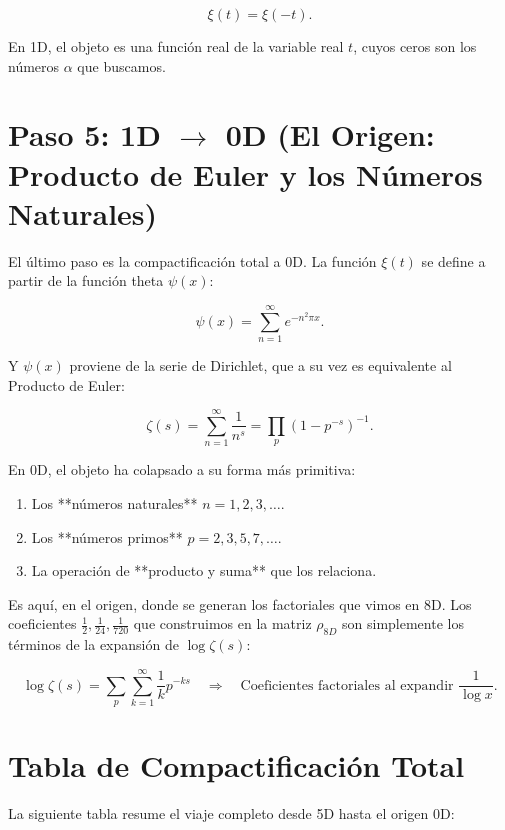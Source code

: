 \documentclass[12pt,a4paper]{article}
\begin{document}
\[
\xi(t) = \xi(-t).
\]

En 1D, el objeto es una función real de la variable real \(t\), cuyos ceros son los números \(\alpha\) que buscamos.

\section{Paso 5: 1D $\to$ 0D (El Origen: Producto de Euler y los Números Naturales)}

El último paso es la compactificación total a 0D. La función \(\xi(t)\) se define a partir de la función theta \(\psi(x)\):

\[
\psi(x) = \sum_{n=1}^{\infty} e^{-n^2 \pi x}.
\]

Y \(\psi(x)\) proviene de la serie de Dirichlet, que a su vez es equivalente al Producto de Euler:

\[
\boxed{ \zeta(s) = \sum_{n=1}^{\infty} \frac{1}{n^s} = \prod_{p} \left( 1 - p^{-s} \right)^{-1} }.
\]

En 0D, el objeto ha colapsado a su forma más primitiva:

\begin{enumerate}
\item Los **números naturales** \(n = 1, 2, 3, \dots\).
\item Los **números primos** \(p = 2, 3, 5, 7, \dots\).
\item La operación de **producto y suma** que los relaciona.
\end{enumerate}

Es aquí, en el origen, donde se generan los factoriales que vimos en 8D. Los coeficientes \(\frac{1}{2}, \frac{1}{24}, \frac{1}{720}\) que construimos en la matriz \(\rho_{8D}\) son simplemente los términos de la expansión de \(\log \zeta(s)\):

\[
\log \zeta(s) = \sum_{p} \sum_{k=1}^{\infty} \frac{1}{k} p^{-ks} \quad \Longrightarrow \quad \text{Coeficientes factoriales al expandir } \frac{1}{\log x}.
\]

\section{Tabla de Compactificación Total}

La siguiente tabla resume el viaje completo desde 5D hasta el origen 0D:
\end{document}
